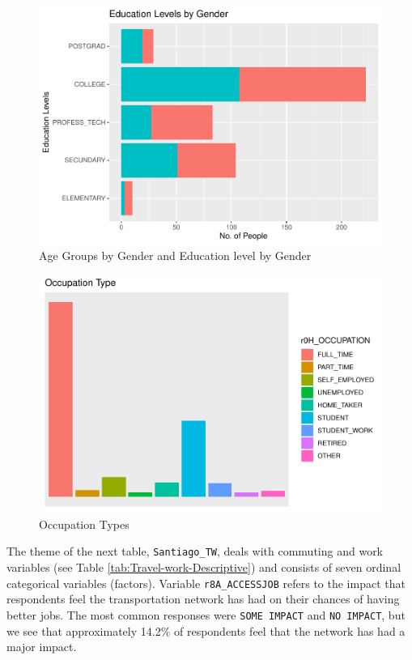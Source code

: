 \documentclass[
11pt, %
oneside, %
english, %
singlespacing, %
]{macthesis} %
\begin{document}
\begin{figure}

{\centering \includegraphics[width=0.85\linewidth]{thesis_files/figure-latex/unnamed-chunk-7-2} 

}

\caption{\label{fig:Education and age by gender}Age Groups by Gender and Education level by Gender}\label{fig:unnamed-chunk-7-2}
\end{figure}
\begin{figure}

{\centering \includegraphics[width=0.85\linewidth]{thesis_files/figure-latex/unnamed-chunk-8-1} 

}

\caption{\label{fig:Occupation type graph}Occupation Types}\label{fig:unnamed-chunk-8}
\end{figure}
The theme of the next table, \texttt{Santiago\_TW}, deals with commuting and work variables (see Table \ref{tab:Travel-work-Descriptive}) and consists of seven ordinal categorical variables (factors). Variable \texttt{r8A\_ACCESSJOB} refers to the impact that respondents feel the transportation network has had on their chances of having better jobs. The most common responses were \texttt{SOME\ IMPACT} and \texttt{NO\ IMPACT}, but we see that approximately 14.2\% of respondents feel that the network has had a major impact.
\end{document}
